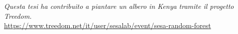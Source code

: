 \begin{titlepage}
\nonumber
\null {}
\begin{flushright}
{\textit{Questa tesi ha contribuito a piantare un albero in Kenya tramite il progetto Treedom.}}
\\
\vspace{0.5cm}
{\footnotesize\url{https://www.treedom.net/it/user/sesalab/event/sesa-random-forest}}
\end{flushright}
\end{titlepage}
